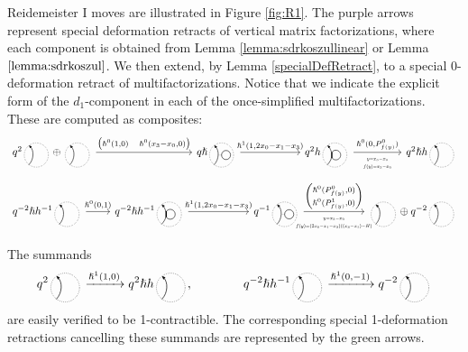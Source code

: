 \documentclass{article}
\theoremstyle{plain} %
\theoremstyle{definition} %
\theoremstyle{remark} %
\begin{document}
Reidemeister I moves are illustrated in Figure \ref{fig:R1}. The purple arrows represent special deformation retracts of vertical matrix factorizations, where each component is obtained from Lemma \ref{lemma:sdrkoszullinear} or Lemma $\ref{lemma:sdrkoszul}$. We then extend, by Lemma \ref{specialDefRetract}, to a special 0-deformation retract of multifactorizations. Notice that we indicate the explicit form of the $d_1$-component in each of the once-simplified multifactorizations. These are computed as composites:
\[
\begin{tikzcd}[column sep=2cm,ampersand replacement=\&]
q^2\scalebox{0.5}{\SingleEdge{}{}}\oplus \scalebox{0.5}{\SingleEdge{}{}}   
\arrow[r, "{\begin{pmatrix} \hslash^0(1,0)&\hslash^0(x_3-x_0,0)
\end{pmatrix}}"] 
\&[1.2cm]
q\hslash\scalebox{0.5}{\ThinEdgeAndCircle{}{}{}} 
\arrow[r, "{\hslash^1(1,2x_0-x_1-x_3)}"]
\&
q^2h\scalebox{0.5}{\ThickEdgeAndCircle{}{}{}}
\arrow[r, "{\hslash^0(0,P^0_{f(y)})}", "\scalebox{0.6}{$\begin{matrix}
    y=x_3-x_0 \\ f(y)= x_3-x_0
\end{matrix}$}"']
\&[-0.4cm]
q^2\hslash h\scalebox{0.5}{\SingleEdge{}{}} 
\end{tikzcd}
\]
\[
\begin{tikzcd}[column sep=2cm, ampersand replacement=\&]
q^{-2}\hslash h^{-1}\scalebox{0.5}{\SingleEdge{}{}}  
\arrow[r, "{\hslash^0(0,1)}"] 
\&[-1.2cm]
q^{-2}\hslash h^{-1}\scalebox{0.5}{\ThickEdgeAndCircle{}{}{}}
\arrow[r, "{\hslash^1(1,2x_0-x_1-x_3)}"]
\&
q^{-1}\scalebox{0.5}{\ThinEdgeAndCircle{}{}{}} 
\arrow[r, "{\begin{pmatrix} \hslash^0(P^0_{f(y)},0) \\
\hslash^0(P^1_{f(y)},0) \end{pmatrix}}", "\scalebox{0.6}{$\begin{matrix}
    y=x_3-x_0 \\ f(y)= (2x_0-x_1-x_3)((x_3-x_1)-H)
\end{matrix}$}"']
\&
\scalebox{0.5}{\SingleEdge{}{}}\oplus q^{-2}\scalebox{0.5}{\SingleEdge{}{}}
\end{tikzcd}
\]



The summands 
$$
q^2\scalebox{0.5}{\SingleEdge{}{}}
\xrightarrow{\hslash^1(1,0)} 
q^2\hslash h\scalebox{0.5}{\SingleEdge{}{}},
\qquad \qquad 
q^{-2}\hslash h^{-1}\scalebox{0.5}{\SingleEdge{}{}}
\xrightarrow{\hslash^1(0,-1)} 
q^{-2}\scalebox{0.5}{\SingleEdge{}{}}
$$
are easily verified to be 1-contractible. The corresponding special 1-deformation retractions cancelling these summands are represented by the green arrows.
\end{document}
